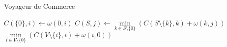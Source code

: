 
\begin{algorithm}[H]
	\caption{Voyageur de Commerce}
	\begin{algorithmic}[1]
			\STATE $C(\{0\},i) \leftarrow \omega(0,i)$
		\ENDFOR
					\STATE $C(S,j) \leftarrow \min\limits_{k \in S \setminus \{0\}}(C(S\setminus\{k\},k) + \omega(k,j))$
				\ENDFOR
			\ENDFOR
		\ENDFOR
		\RETURN $\min\limits_{i\in V\setminus\{0\}}(C(V\setminus\{i\},i) + \omega(i,0))$
	\end{algorithmic}
\end{algorithm}

